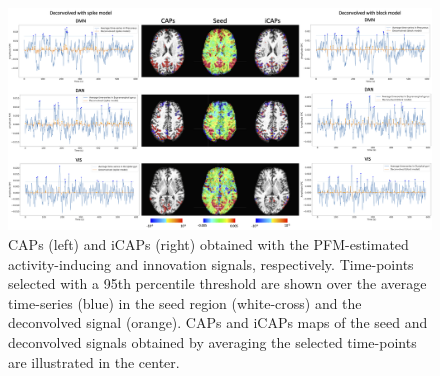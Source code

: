 \begin{figure}[t!]
    \begin{center}
        \includegraphics[width=\textwidth]{figures/caps.png}
    \end{center}
    \caption{CAPs (left) and iCAPs (right) obtained with the PFM-estimated activity-inducing and innovation signals, respectively. Time-points selected with a 95th percentile threshold are shown over the average time-series (blue) in the seed region (white-cross) and the deconvolved signal (orange). CAPs and iCAPs maps of the seed and deconvolved signals obtained by averaging the selected time-points are illustrated in the center.}
\label{fig:caps}
\end{figure}

